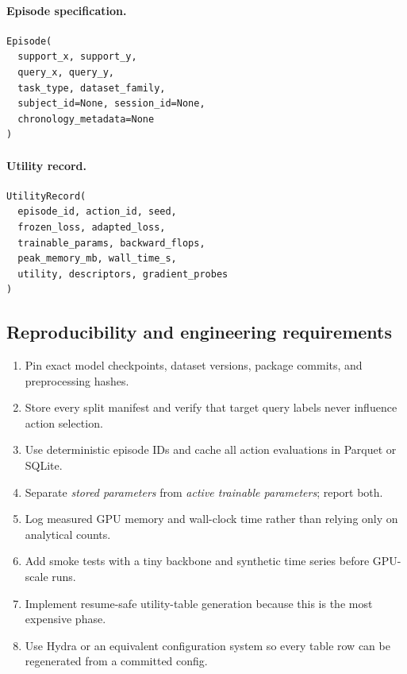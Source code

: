 \documentclass[10pt]{article}
\begin{document}
\paragraph{Episode specification.}
\begin{lstlisting}
Episode(
  support_x, support_y,
  query_x, query_y,
  task_type, dataset_family,
  subject_id=None, session_id=None,
  chronology_metadata=None
)
\end{lstlisting}

\paragraph{Utility record.}
\begin{lstlisting}
UtilityRecord(
  episode_id, action_id, seed,
  frozen_loss, adapted_loss,
  trainable_params, backward_flops,
  peak_memory_mb, wall_time_s,
  utility, descriptors, gradient_probes
)
\end{lstlisting}

\subsection{Reproducibility and engineering requirements}

\begin{enumerate}[leftmargin=*, itemsep=2pt]
    \item Pin exact model checkpoints, dataset versions, package commits, and preprocessing hashes.
    \item Store every split manifest and verify that target query labels never influence action selection.
    \item Use deterministic episode IDs and cache all action evaluations in Parquet or SQLite.
    \item Separate \emph{stored parameters} from \emph{active trainable parameters}; report both.
    \item Log measured GPU memory and wall-clock time rather than relying only on analytical counts.
    \item Add smoke tests with a tiny backbone and synthetic time series before GPU-scale runs.
    \item Implement resume-safe utility-table generation because this is the most expensive phase.
    \item Use Hydra or an equivalent configuration system so every table row can be regenerated from a committed config.
\end{enumerate}
\end{document}
